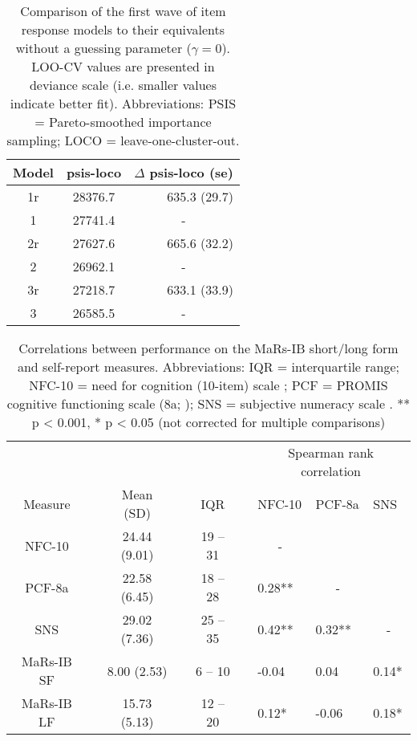 \documentclass[a4paper,man,natbib]{apa6}
\begin{document}
\begin{table}
    \centering
    \begin{tabular*}{0.45\textwidth}{ccr}
    \toprule
    Model & psis-loco & $\Delta$ psis-loco (se) \\
    \midrule
    1r & 28376.7 & 635.3 (29.7) \\
    1 & 27741.4 & \multicolumn{1}{c}{-} \\
    \midrule
    2r & 27627.6 & 665.6 (32.2) \\
    2 & 26962.1 & \multicolumn{1}{c}{-} \\
    \midrule
    3r & 27218.7 & 633.1 (33.9) \\
    3 & 26585.5 & \multicolumn{1}{c}{-} \\
    \bottomrule
    \end{tabular*}
    \caption{\label{tab:2}\normalfont Comparison of the first wave of item response models to their equivalents without a guessing parameter ($\gamma = 0$). LOO-CV values are presented in deviance scale (i.e. smaller values indicate better fit). Abbreviations: PSIS = Pareto-smoothed importance sampling; LOCO = leave-one-cluster-out.}
    \label{table:2}
\end{table}

\begin{table}
\centering
\begin{tabular*}{0.9\textwidth}{cccccclll}
\toprule
 & & & & & & \multicolumn{3}{c}{Spearman rank correlation} \\
\cmidrule(lr){7-9}
Measure & & Mean (SD) & & IQR & &  NFC-10 & PCF-8a & SNS \\
\midrule
NFC-10  & & 24.44 (9.01) & & 19 -- 31 & & \multicolumn{1}{c}{-} &  &  \\
PCF-8a  & & 22.58 (6.45) & & 18 -- 28 & & 0.28** &  \multicolumn{1}{c}{-} &   \\
SNS     & & 29.02 (7.36) & & 25 -- 35 & & 0.42** &  0.32** &  \multicolumn{1}{c}{-}   \\
MaRs-IB SF & &  8.00 (2.53) & &  6 -- 10 & & -0.04  &  0.04 &  0.14*  \\
MaRs-IB LF & & 15.73 (5.13) & & 12 -- 20 & & 0.12*   &  -0.06 &  0.18*  \\
\bottomrule
\end{tabular*}
\captionsetup{width=1.\textwidth}
\caption{\normalfont Correlations between performance on the MaRs-IB short/long form and self-report measures. Abbreviations: IQR = interquartile range; NFC-10 = need for cognition (10-item) scale \citep{chiesi2018applying}; PCF = PROMIS cognitive functioning scale (8a; \citealt{iverson2021normative}); SNS = subjective numeracy scale \citep{fagerlin2007measuring}. ** p < 0.001,  * p < 0.05 (not corrected for multiple comparisons)}
\end{table}
\end{document}
